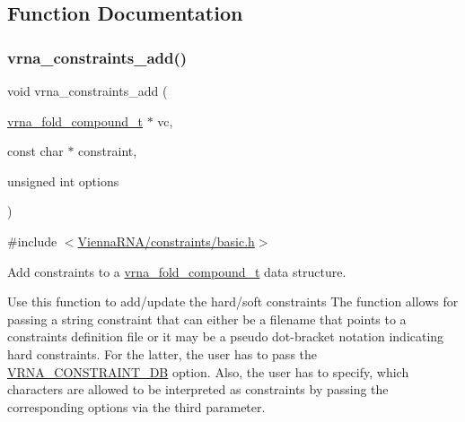 \subsection{Function Documentation}
\mbox{\label{group__constraints_ga35a401f680969a556858a8dd5f1d07cc}} 
\subsubsection{\texorpdfstring{vrna\+\_\+constraints\+\_\+add()}{vrna\_constraints\_add()}}
{\footnotesize\ttfamily void vrna\+\_\+constraints\+\_\+add (\begin{DoxyParamCaption}\item[{\hyperlink{group__fold__compound_ga1b0cef17fd40466cef5968eaeeff6166}{vrna\+\_\+fold\+\_\+compound\+\_\+t} $\ast$}]{vc,  }\item[{const char $\ast$}]{constraint,  }\item[{unsigned int}]{options }\end{DoxyParamCaption})}



{\ttfamily \#include $<$\hyperlink{constraints_2basic_8h}{Vienna\+R\+N\+A/constraints/basic.\+h}$>$}



Add constraints to a \hyperlink{group__fold__compound_ga1b0cef17fd40466cef5968eaeeff6166}{vrna\+\_\+fold\+\_\+compound\+\_\+t} data structure. 

Use this function to add/update the hard/soft constraints The function allows for passing a string \textquotesingle{}constraint\textquotesingle{} that can either be a filename that points to a constraints definition file or it may be a pseudo dot-\/bracket notation indicating hard constraints. For the latter, the user has to pass the \hyperlink{group__hard__constraints_ga4bfc2f15c4f261c62a11af9d2aa80c90}{V\+R\+N\+A\+\_\+\+C\+O\+N\+S\+T\+R\+A\+I\+N\+T\+\_\+\+DB} option. Also, the user has to specify, which characters are allowed to be interpreted as constraints by passing the corresponding options via the third parameter.

